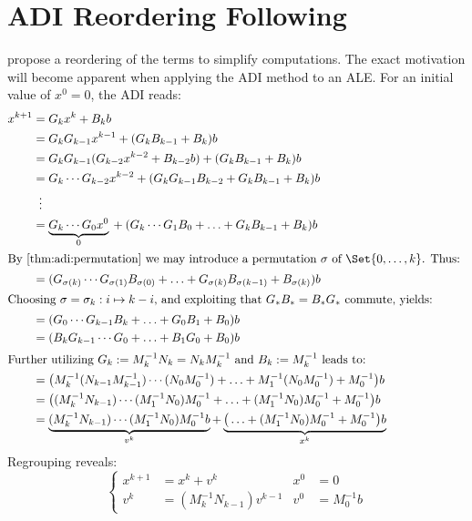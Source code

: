 \chapter{ADI Reordering Following \citeauthor{Li2002}}
\label{sec:li2002}

\citeauthor{Li2002} \cite{Li2002} propose a reordering of the terms to simplify computations.
The exact motivation will become apparent when applying the \ac{ADI} method to an \ac{ALE}.
For an initial value of $x^0 = 0$,
the \ac{ADI} reads:
\begin{align*}
  x^{k+1}
  &= G_k x^k + B_k b \\
  &= G_k G_{k-1} x^{k-1} + (G_k B_{k-1} + B_k) b \\
  &= G_k G_{k-1} (G_{k-2} x^{k-2} + B_{k-2}b) + (G_k B_{k-1} + B_k) b \\
  &= G_k \cdots G_{k-2} x^{k-2} + (G_k G_{k-1} B_{k-2} + G_k B_{k-1} + B_k) b \\
  &\vdotswithin{=} \\
  &= \underbrace{G_k \cdots G_0 x^0}_0 {} + (G_k \cdots G_1 B_0 + \ldots + G_k B_{k-1} + B_k) b \\
\intertext{%
  By \autoref{thm:adi:permutation} we may introduce a permutation $\sigma$ of $\Set{0,\ldots,k}$.
  Thus:
}
  &= (G_{\sigma(k)} \cdots G_{\sigma(1)} B_{\sigma(0)} + \ldots + G_{\sigma(k)} B_{\sigma(k-1)} + B_{\sigma(k)}) b \\
\intertext{%
  Choosing $\sigma = \sigma_k : i \mapsto k-i$,
  and exploiting that $G_* B_* = B_* G_*$ commute,
  yields:
}
  &= (G_0 \cdots G_{k-1} B_k + \ldots + G_0 B_1 + B_0) b \\
  &= (B_k G_{k-1} \cdots G_0 + \ldots + B_1 G_0 + B_0) b \\
\intertext{%
  Further utilizing $G_k := M_k^{-1} N_k = N_k M_k^{-1}$ and $B_k := M_k^{-1}$ leads to:
}
  &= \big( M_k^{-1} (N_{k-1} M_{k-1}^{-1}) \cdots (N_0 M_0^{-1}) + \ldots + M_1^{-1} (N_0 M_0^{-1}) + M_0^{-1} \big) b \\
  &= \big( (M_k^{-1} N_{k-1}) \cdots (M_1^{-1} N_0) M_0^{-1} + \ldots + (M_1^{-1} N_0) M_0^{-1} + M_0^{-1} \big) b \\
  &= \underbrace{
    (M_k^{-1} N_{k-1}) \cdots (M_1^{-1} N_0) M_0^{-1} b
  }_{v^k}
  + \underbrace{
    \big( \ldots + (M_1^{-1} N_0) M_0^{-1} + M_0^{-1} \big) b
  }_{x^k}
\end{align*}
Regrouping reveals:
\begin{equation*}
\left\{
\begin{aligned}
  x^{k+1} &= x^k + v^k &
  x^0 &= 0 \\
  v^k &= (M_k^{-1} N_{k-1}) v^{k-1} &
  v^0 &= M_0^{-1} b
\end{aligned}
\right.
\end{equation*}
